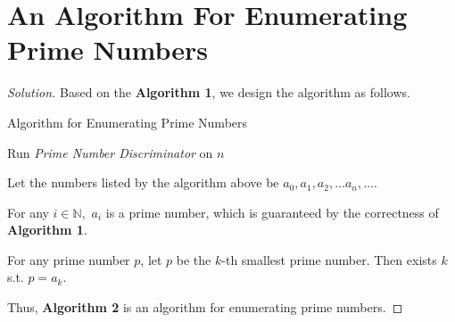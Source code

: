 \documentclass{article}
\newenvironment{solution}{\begin{proof}[\noindent\it Solution]}{\end{proof}}
\begin{document}
\vspace{1em}
\section{An Algorithm For Enumerating Prime Numbers}
\vspace{1em}
\begin{solution}
    Based on the \textbf{Algorithm 1}, we design the algorithm as follows.
    
    \vspace{-0.5em}
    \begin{algorithm}
        \caption{Algorithm for Enumerating Prime Numbers}
        
	    {
	    {
            Run \textit{Prime Number Discriminator} on $n$\;
	    }
	    }
    \end{algorithm}
    
    \vspace{-0.9em}\hspace{1.3em}
    Let the numbers listed by the algorithm above be $a_0,a_1,a_2,...a_n,...$.
    
    \hspace{1.3em}
    For any $i\in\mathbb{N},$ $a_i$ is a prime number, which is guaranteed by the correctness of \textbf{Algorithm 1}.
    
    \hspace{1.3em}
    For any prime number $p$, let $p$ be the $k$-th smallest prime number. Then exists $k$ s.t. $p=a_k$.
    
    \hspace{1.3em}
    Thus, \textbf{Algorithm 2} is an algorithm for enumerating prime numbers.    
\end{solution}

\vspace{1em}
\end{document}
